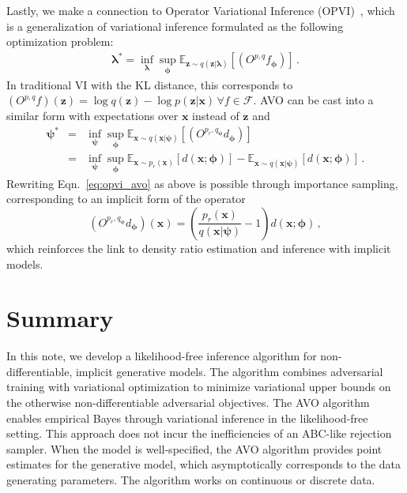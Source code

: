 \documentclass[twocolumn,superscriptaddress,aps]{revtex4-1}
\newcommand{\bfpsi}{{\bm \psi}}
\newcommand{\bfphi}{{\bm \phi}}
\newcommand{\bflambda}{{\bm \lambda}}
\newcommand{\bfx}{\mathbf{x}}
\newcommand{\bfz}{\mathbf{z}}
\theoremstyle{plain}
\begin{document}
Lastly, we make a connection to Operator Variational Inference (OPVI)~\citep{2016arXiv161009033R},
which is a generalization of variational inference formulated as the following optimization problem:
\begin{eqnarray}
\bflambda^* = \inf_\bflambda \sup_\bfphi \mathbb{E}_{ \bfz \sim q( \bfz | \bflambda)} [ (O^{p,q} f_\bfphi) ] \, .
\end{eqnarray}
In traditional VI with the KL distance, this corresponds to $(O^{p,q} f)(\bfz) = \log q(\bfz) - \log p(\bfz|\bfx) \, \forall f \in \mathcal{F}$.
AVO can be cast into a similar form with expectations over $\bfx$ instead of $\bfz$ and
\begin{eqnarray} \label{eq:opvi_avo}
\bfpsi^* &=& \inf_\bfpsi \sup_\bfphi \mathbb{E}_{ \bfx \sim q( \bfx | \bfpsi)} [ (O^{p_r,q_\bfpsi} d_\bfphi) ] \\
\label{eq:opvi_avo2} &=&  \inf_\bfpsi \sup_\bfphi \mathbb{E}_{\bfx\sim p_r(\bfx)}[d(\bfx; \bfphi)] - \mathbb{E}_{\bfx \sim q(\bfx|\bfpsi)}[d(\bfx; \bfphi)] \nonumber \, .
\end{eqnarray}
Rewriting Eqn.~\ref{eq:opvi_avo} as above is possible through importance sampling,
corresponding to an implicit form of the operator
\begin{equation}
(O^{p_r,q_\bfpsi} d_\bfphi)(\bfx) = \left( \frac{p_r(\bfx)}{q(\bfx|\bfpsi)}  -1 \right) d(\bfx; \bfphi) \, ,
\end{equation}
which reinforces the link to density ratio estimation and inference with implicit models.



\section{Summary}

In this note, we develop a likelihood-free inference algorithm for
non-differentiable, implicit generative models. The algorithm combines
adversarial training  with variational optimization to minimize variational
upper bounds  on the otherwise non-differentiable adversarial objectives. The
AVO algorithm enables empirical Bayes through variational inference in the
likelihood-free setting. This approach does not incur the inefficiencies of an
ABC-like rejection sampler. When the model is well-specified, the AVO algorithm
provides point estimates for
the generative model, which asymptotically corresponds to the data generating
parameters. The algorithm works on continuous or discrete data.
\end{document}
